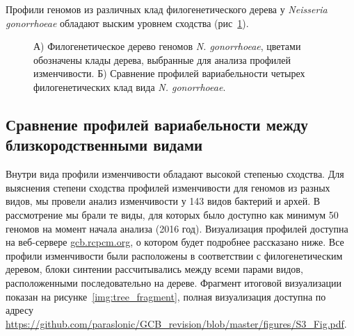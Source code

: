 Профили геномов из различных клад филогенетического дерева у \textit{Neisseria gonorrhoeae} обладают выским уровнем сходства (рис~\ref{img:ghono_complex}).

\begin{figure}[!ht] 
  \center
  \caption{ А) Филогенетическое дерево геномов \textit{N. gonorrhoeae}, цветами обозначены клады дерева, выбранные для анализа профилей изменчивости. Б) Сравнение профилей вариабельности четырех филогенетических клад вида \textit{N. gonorrhoeae}.}
  \label{img:ghono_complex} 
\end{figure}

\subsection{Сравнение профилей вариабельности между близкородственными видами}

Внутри вида профили изменчивости обладают высокой степенью сходства. Для выяснения степени сходства профилей изменчивости для геномов из разных видов, мы провели анализ изменчивости у 143 видов бактерий и архей. В рассмотрение мы брали те виды, для которых было доступно как минимум 50 геномов на момент начала анализа (2016 год). Визуализация профилей доступна на веб-сервере \url{gcb.rcpcm.org}, о котором будет подробнее рассказано ниже. Все профили изменчивости были расположены в соответствии с филогенетическим деревом, блоки синтении рассчитывались между всеми парами видов, расположенными последовательно на дереве. Фрагмент итоговой визуализации показан на рисунке~\ref{img:tree_fragment}, полная визуализация доступна по адресу \url{https://github.com/paraslonic/GCB_revision/blob/master/figures/S3_Fig.pdf}. 

